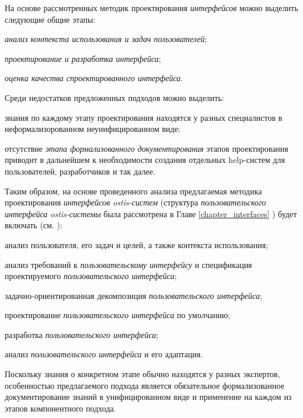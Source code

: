 На основе рассмотренных методик проектирования \textit{интерфейсов} можно выделить следующие общие этапы:
\begin{textitemize}
\item \textit{анализ контекста использования и задач пользователей};
\item \textit{проектирование и разработка \textit{интерфейса}};
\item \textit{оценка качества спроектированного \textit{интерфейса}}.
\end{textitemize}

Среди недостатков предложенных подходов можно выделить:
\begin{textitemize}
	\item знания по каждому этапу проектирования находятся у разных специалистов в неформализорованном неунифицированном виде;
	\item отсутствие \textit{этапа формализованного документирования} этапов проектирования приводит в дальнейшем к необходимости создания отдельных help-систем для пользователей, разработчиков и так далее.
\end{textitemize}

Таким образом, на основе проведенного анализа предлагаемая методика проектирования \textit{интерфейсов ostis-систем} (структура \textit{пользовательского интерфейса ostis-системы} была рассмотрена в Главе \ref{chapter_interfaces} ) будет включать (см. ):
\begin{textitemize}
\item анализ пользователя, его задач и целей, а также контекста использования;
\item анализ требований к \textit{пользовательскому интерфейсу} и спецификация проектируемого \textit{пользовательского интерфейса};
\item задачно-ориентированная декомпозиция \textit{пользовательского интерфейса};
\item проектирование \textit{пользовательского интерфейса} по умолчанию;
\item разработка \textit{пользовательского интерфейса};
\item анализ \textit{пользовательского интерфейса} и его адаптация.
\end{textitemize}

Поскольку знания о конкретном этапе обычно находятся у разных экспертов, особенностью предлагаемого подхода является обязательное формализованное документирование знаний в унифицированном виде и применение на каждом из этапов компонентного подхода.

